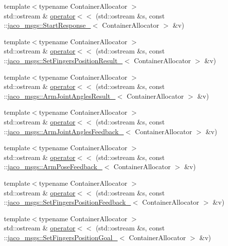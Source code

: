 \begin{DoxyCompactItemize}
\item 
{\footnotesize template$<$typename Container\+Allocator $>$ }\\std\+::ostream \& \hyperlink{namespacejaco__msgs_a241eb1c4f581da0f6144e2c8acfe337e}{operator$<$$<$} (std\+::ostream \&s, const \+::\hyperlink{structjaco__msgs_1_1StartResponse__}{jaco\+\_\+msgs\+::\+Start\+Response\+\_\+}$<$ Container\+Allocator $>$ \&v)
\item 
{\footnotesize template$<$typename Container\+Allocator $>$ }\\std\+::ostream \& \hyperlink{namespacejaco__msgs_a81fb2dce1b71ccbed6b1ef3ecaecb1f9}{operator$<$$<$} (std\+::ostream \&s, const \+::\hyperlink{structjaco__msgs_1_1SetFingersPositionResult__}{jaco\+\_\+msgs\+::\+Set\+Fingers\+Position\+Result\+\_\+}$<$ Container\+Allocator $>$ \&v)
\item 
{\footnotesize template$<$typename Container\+Allocator $>$ }\\std\+::ostream \& \hyperlink{namespacejaco__msgs_a717bd22d9889a8ff191007cf8899c1f8}{operator$<$$<$} (std\+::ostream \&s, const \+::\hyperlink{structjaco__msgs_1_1ArmJointAnglesResult__}{jaco\+\_\+msgs\+::\+Arm\+Joint\+Angles\+Result\+\_\+}$<$ Container\+Allocator $>$ \&v)
\item 
{\footnotesize template$<$typename Container\+Allocator $>$ }\\std\+::ostream \& \hyperlink{namespacejaco__msgs_adf1d29198813ed97d2f74e16df9d84ba}{operator$<$$<$} (std\+::ostream \&s, const \+::\hyperlink{structjaco__msgs_1_1ArmJointAnglesFeedback__}{jaco\+\_\+msgs\+::\+Arm\+Joint\+Angles\+Feedback\+\_\+}$<$ Container\+Allocator $>$ \&v)
\item 
{\footnotesize template$<$typename Container\+Allocator $>$ }\\std\+::ostream \& \hyperlink{namespacejaco__msgs_a05627a8b7be13e2489c2b0ee45b1cce3}{operator$<$$<$} (std\+::ostream \&s, const \+::\hyperlink{structjaco__msgs_1_1ArmPoseFeedback__}{jaco\+\_\+msgs\+::\+Arm\+Pose\+Feedback\+\_\+}$<$ Container\+Allocator $>$ \&v)
\item 
{\footnotesize template$<$typename Container\+Allocator $>$ }\\std\+::ostream \& \hyperlink{namespacejaco__msgs_abda7b948093aeca689735435ebbc3ac0}{operator$<$$<$} (std\+::ostream \&s, const \+::\hyperlink{structjaco__msgs_1_1SetFingersPositionFeedback__}{jaco\+\_\+msgs\+::\+Set\+Fingers\+Position\+Feedback\+\_\+}$<$ Container\+Allocator $>$ \&v)
\item 
{\footnotesize template$<$typename Container\+Allocator $>$ }\\std\+::ostream \& \hyperlink{namespacejaco__msgs_a9084441cabe7bc4495ffb2595e73b98a}{operator$<$$<$} (std\+::ostream \&s, const \+::\hyperlink{structjaco__msgs_1_1SetFingersPositionGoal__}{jaco\+\_\+msgs\+::\+Set\+Fingers\+Position\+Goal\+\_\+}$<$ Container\+Allocator $>$ \&v)

\end{DoxyCompactItemize}
